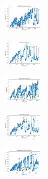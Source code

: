 \begin{figure}[H]
\begin{subfigure}
    \end{subfigure}
    \hfill
    \begin{subfigure}
        \centering
        \includegraphics[width=0.234\textwidth]{img/ils/newthyroid_set_const_10_277451237_time.png}
    \end{subfigure}
    \hfill
    \begin{subfigure}
        \centering
        \includegraphics[width=0.234\textwidth]{img/ils/iris_set_const_10_49258669_time.png}
    \end{subfigure}
    \hfill
    \begin{subfigure}
        \centering
        \includegraphics[width=0.234\textwidth]{img/ils/ecoli_set_const_10_49258669_time.png}
    \end{subfigure}
    \hfill
    \begin{subfigure}
        \centering
        \includegraphics[width=0.234\textwidth]{img/ils/rand_set_const_10_49258669_time.png}
    \end{subfigure}
    \hfill
    \begin{subfigure}
        \centering
        \includegraphics[width=0.234\textwidth]{img/ils/newthyroid_set_const_10_49258669_time.png}
    \end{subfigure}
    \hfill
    \begin{subfigure}

\end{subfigure}
\end{figure}

